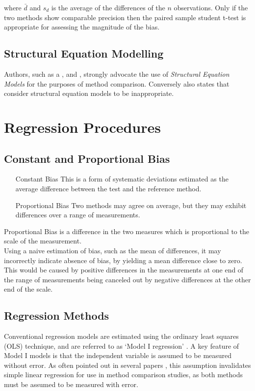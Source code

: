 \documentclass[12pt, a4paper]{report}
\theoremstyle{plain}
\theoremstyle{definition}
\theoremstyle{remark}
\begin{document}
		where $\bar{d}$ and $s_{d}$ is the average of the differences of
		the $n$ observations. Only if the two methods show comparable
		precision then the paired sample student t-test is appropriate for
		assessing the magnitude of the bias.
	
	\section*{Structural Equation Modelling}
	Authors, such as a \citet{lewis}, \citet{dunnSEME} and \citet{voelkel2005center}, strongly advocate the use of \textit{Structural Equation Models} for the purposes of method comparison. Conversely \citet{BA99} also states that consider structural equation models to be inappropriate.
	


	\chapter{Regression Procedures}
	\section{Constant and Proportional Bias}
	\begin{itemize}
		\item[Constant Bias] This is a form of systematic deviations estimated as the average difference between the test
		and the reference method.
		\item[Proportional Bias] Two methods may agree on average, but they may exhibit differences over a range of measurements.
	\end{itemize}
	
	Proportional Bias is a difference in the two measures which is proportional to the scale of the measurement. \\Using a naive estimation of bias, such as the mean of differences, it may incorrectly indicate absence of bias, by yielding a mean difference close to zero. This would be caused by positive differences in the measurements at one end of the range of measurements being canceled out by negative differences at the other end of the scale.

		\section{Regression Methods}
		Conventional regression models are estimated using the ordinary
		least squares (OLS) technique, and are referred to as `Model I
		regression' \citep{CornCoch,ludbrook97}. A key feature of Model I
		models is that the independent variable is assumed to be measured
		without error. As often pointed out in several papers
		\citep{BA83,ludbrook97}, this assumption invalidates simple linear
		regression for use in method comparison studies, as both methods
		must be assumed to be measured with error.
		
\end{document}
